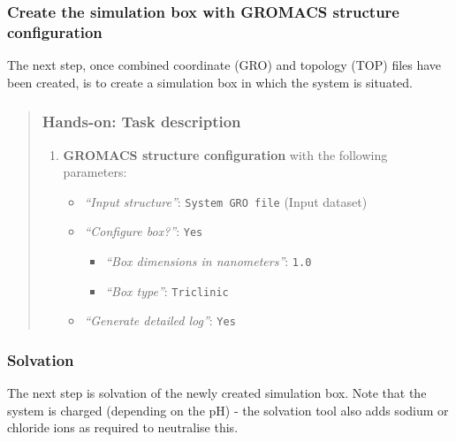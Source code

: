 \documentclass[twocolumn]{bmcart}%
\providecommand{\tightlist}{%
  \setlength{\itemsep}{0pt}\setlength{\parskip}{0pt}}
\providecommand{\tightlist}{%
  \setlength{\itemsep}{0pt}\setlength{\parskip}{0pt}}
\begin{document}

\subsubsection{\texorpdfstring{Create the simulation box with
\textbf{GROMACS structure
configuration}}{Create the simulation box with GROMACS structure configuration}}\label{create-the-simulation-box-with-gromacs-structure-configuration}

The next step, once combined coordinate (GRO) and topology (TOP) files
have been created, is to create a simulation box in which the system is
situated.

\begin{quote}
\hypertarget{hands-on-task-description-3}{%
\subsubsection{Hands-on: Task
description}\label{hands-on-task-description-3}}

\begin{enumerate}
\def\labelenumi{\arabic{enumi}.}
\item
  \textbf{GROMACS structure configuration} with the following
  parameters:

  \begin{itemize}
  \item
    \emph{``Input structure''}: \texttt{System\ GRO\ file} (Input
    dataset)
  \item
    \emph{``Configure box?''}: \texttt{Yes}

    \begin{itemize}
    \item
      \emph{``Box dimensions in nanometers''}: \texttt{1.0}
    \item
      \emph{``Box type''}: \texttt{Triclinic}
    \end{itemize}
  \item
    \emph{``Generate detailed log''}: \texttt{Yes}
  \end{itemize}
\end{enumerate}

\end{quote}

\subsubsection{Solvation}\label{solvation}
The next step is solvation of the newly created simulation box. Note
that the system is charged (depending on the pH) - the solvation tool
also adds sodium or chloride ions as required to neutralise this.
\end{document}
